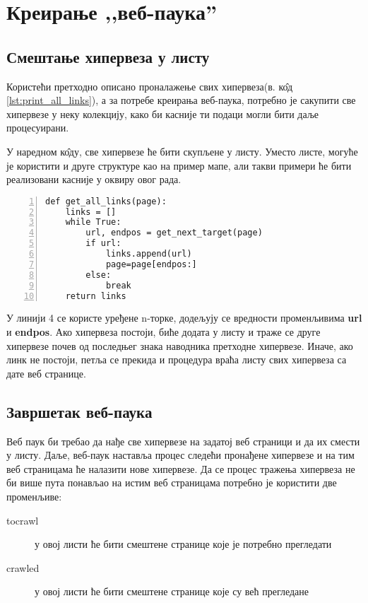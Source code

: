 \section{Креирање ,,веб-паука''}

\subsection{Смештање хипервеза у листу}

Користећи претходно описано проналажење свих хипервеза(в. к\^{о}д \ref{lst:print_all_links}), а за потребе креирања веб-паука, потребно је сакупити све хипервезе у неку колекцију, како би касније ти подаци могли бити даље процесуирани.

У наредном к\^{о}ду, све хипервезе ће бити скупљене у листу. Уместо листе, могуће је користити и друге структуре као на пример мапе, али такви примери ће бити реализовани касније у оквиру овог рада.

\begin{lstlisting}[caption=Процедура смештања свих хиперлинкова у листу, label={lst:getalllinks}, numbers=left]
def get_all_links(page):
    links = []
    while True:
        url, endpos = get_next_target(page)
        if url:
            links.append(url)
            page=page[endpos:]
        else:
            break
    return links
\end{lstlisting}

У линији 4 се користе уређене n-торке, додељују се вредности променљивима \textbf{url} и \textbf{endpos}. Ако хипервеза постоји, биће додата у листу и траже се друге хипервезе почев од последњег знака наводника претходне хипервезе. Иначе, ако линк не постоји, петља се прекида и процедура враћа листу свих хипервеза са дате веб странице.

\subsection{Завршетак веб-паука}

Веб паук би требао да нађе све хипервезе на задатој веб страници и да их смести у листу. Даље, веб-паук наставља процес следећи пронађене хипервезе и на тим веб страницама ће налазити нове хипервезе. Да се процес тражења хипервеза не би више пута понављао на истим веб страницама потребно је користити две променљиве:

\begin{description}
\item[tocrawl] у овој листи ће бити смештене странице које је потребно прегледати
\item[crawled] у овој листи ће бити смештене странице које су већ прегледане
\end{description}

